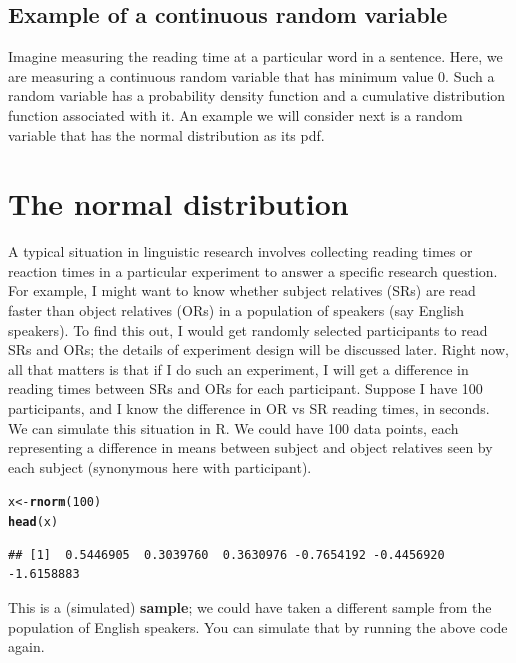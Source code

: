 \documentclass[12pt]{book}\usepackage[]{graphicx}\usepackage[]{color}
\makeatletter
\newcommand{\hlnum}[1]{\textcolor[rgb]{0.686,0.059,0.569}{#1}}%
\newcommand{\hlstd}[1]{\textcolor[rgb]{0.345,0.345,0.345}{#1}}%
\newcommand{\hlkwb}[1]{\textcolor[rgb]{0.69,0.353,0.396}{#1}}%
\newcommand{\hlkwd}[1]{\textcolor[rgb]{0.737,0.353,0.396}{\textbf{#1}}}%
\newenvironment{kframe}{%
 \def\at@end@of@kframe{}%
 \ifinner\ifhmode%
  \def\at@end@of@kframe{\end{minipage}}%
  \begin{minipage}{\columnwidth}%
 \fi\fi%
 \def\FrameCommand##1{\hskip\@totalleftmargin \hskip-\fboxsep
 \colorbox{shadecolor}{##1}\hskip-\fboxsep
     \hskip-\linewidth \hskip-\@totalleftmargin \hskip\columnwidth}%
 \MakeFramed {\advance\hsize-\width
   \@totalleftmargin\z@ \linewidth\hsize
   \@setminipage}}%
 {\par\unskip\endMakeFramed%
 \at@end@of@kframe}
\newenvironment{knitrout}{}{} %
\makeatother
\begin{document}
\subsection{Example of a continuous random variable}

Imagine measuring the reading time at a particular word in a sentence. Here, we are measuring a continuous random variable that has minimum value 0.  Such a random variable has a probability density function and a cumulative distribution function associated with it. An example we will consider next is a random variable that has the normal distribution as its pdf.


\section{The normal distribution}

A typical situation in linguistic research involves collecting reading times or reaction times in a particular experiment to answer a specific research question.   For example, I might want to know whether subject relatives (SRs) are read faster than object relatives (ORs) in a population of speakers (say 
English speakers). To find this out, I would get randomly selected participants to read SRs and ORs; the details of experiment design will be discussed later. Right now, all that matters is that if I do such an experiment, I will get a difference in reading times between SRs and ORs for each participant. Suppose I have 100 participants, and I know the difference in OR vs SR reading times, in seconds. We can simulate this situation in R. We could have 100 data points, each representing a difference in means between subject and object relatives seen by each subject (synonymous here with participant). 

\begin{knitrout}
\color{fgcolor}\begin{kframe}
\begin{alltt}
\hlstd{x}\hlkwb{<-}\hlkwd{rnorm}\hlstd{(}\hlnum{100}\hlstd{)}
\hlkwd{head}\hlstd{(x)}
\end{alltt}
\begin{verbatim}
## [1]  0.5446905  0.3039760  0.3630976 -0.7654192 -0.4456920 -1.6158883
\end{verbatim}
\end{kframe}
\end{knitrout}

This is a (simulated) \textbf{sample}; we could have taken a different sample from the population of English speakers. You can simulate that by running the above code again.
\end{document}
